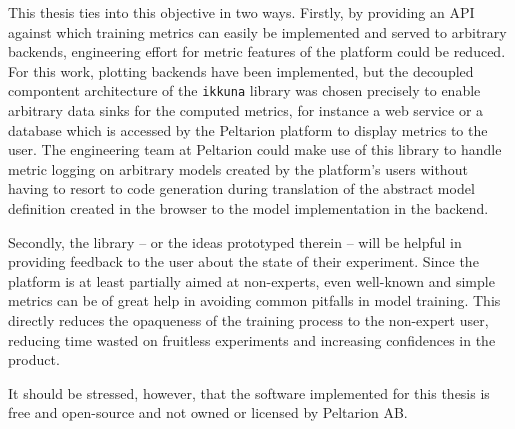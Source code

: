 This thesis ties into this objective in two ways. Firstly, by providing an API against
which training metrics can easily be implemented and served to arbitrary
backends, engineering effort for metric features of the platform could be reduced. For
this work, plotting backends have been implemented, but the decoupled compontent
architecture of the \texttt{ikkuna} library was chosen precisely to enable
arbitrary data sinks for the computed metrics, for instance a web service or a
database which is accessed by the Peltarion platform to display metrics to the
user. The engineering team at Peltarion could make use of this library to handle
metric logging on arbitrary models created by the platform's users without
having to resort to code generation during translation of the abstract model
definition created in the browser to the model implementation in the backend.

Secondly, the library -- or the ideas prototyped therein -- will be helpful in
providing feedback to the user about the state of their experiment. Since the
platform is at least partially aimed at non-experts, even well-known and simple
metrics can be of great help in avoiding common pitfalls in model training. This
directly reduces the opaqueness of the training process to the non-expert user,
reducing time wasted on fruitless experiments and increasing confidences in the
product.

It should be stressed, however, that the software implemented for this thesis is
free and open-source and not owned or licensed by Peltarion AB.
